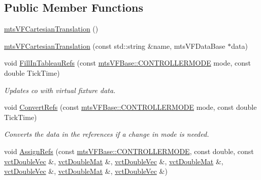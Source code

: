 \subsection*{Public Member Functions}
\begin{DoxyCompactItemize}
\item 
\hyperlink{classmts_v_f_cartesian_translation_a7d231a8919224a527952de0642ada8a3}{mts\-V\-F\-Cartesian\-Translation} ()
\item 
\hyperlink{classmts_v_f_cartesian_translation_a665414c1fa25cee96c3b4ce1d2896af2}{mts\-V\-F\-Cartesian\-Translation} (const std\-::string \&name, mts\-V\-F\-Data\-Base $\ast$data)
\item 
void \hyperlink{classmts_v_f_cartesian_translation_ad86d342b2fb779bb9cd6755c175bfeea}{Fill\-In\-Tableau\-Refs} (const \hyperlink{classmts_v_f_base_a742dd08f8b70bafeb746cec14d9ee974}{mts\-V\-F\-Base\-::\-C\-O\-N\-T\-R\-O\-L\-L\-E\-R\-M\-O\-D\-E} mode, const double Tick\-Time)
\begin{DoxyCompactList}\small\item\em Updates co with virtual fixture data. \end{DoxyCompactList}\item 
void \hyperlink{classmts_v_f_cartesian_translation_aaf1a2989af3387cc5355b3adaaae5fc2}{Convert\-Refs} (const \hyperlink{classmts_v_f_base_a742dd08f8b70bafeb746cec14d9ee974}{mts\-V\-F\-Base\-::\-C\-O\-N\-T\-R\-O\-L\-L\-E\-R\-M\-O\-D\-E} mode, const double Tick\-Time)
\begin{DoxyCompactList}\small\item\em Converts the data in the references if a change in mode is needed. \end{DoxyCompactList}\item 
void \hyperlink{classmts_v_f_cartesian_translation_abc87c7d13e2c60839e9a02e0e6b2742b}{Assign\-Refs} (const \hyperlink{classmts_v_f_base_a742dd08f8b70bafeb746cec14d9ee974}{mts\-V\-F\-Base\-::\-C\-O\-N\-T\-R\-O\-L\-L\-E\-R\-M\-O\-D\-E}, const double, const \hyperlink{vct_dynamic_vector_types_8h_ade4b3068c86fb88f41af2e5187e491c2}{vct\-Double\-Vec} \&, \hyperlink{vct_dynamic_matrix_types_8h_a48f1eb2461d20a99e824ee5753a37c84}{vct\-Double\-Mat} \&, \hyperlink{vct_dynamic_vector_types_8h_ade4b3068c86fb88f41af2e5187e491c2}{vct\-Double\-Vec} \&, \hyperlink{vct_dynamic_matrix_types_8h_a48f1eb2461d20a99e824ee5753a37c84}{vct\-Double\-Mat} \&, \hyperlink{vct_dynamic_vector_types_8h_ade4b3068c86fb88f41af2e5187e491c2}{vct\-Double\-Vec} \&, \hyperlink{vct_dynamic_matrix_types_8h_a48f1eb2461d20a99e824ee5753a37c84}{vct\-Double\-Mat} \&, \hyperlink{vct_dynamic_vector_types_8h_ade4b3068c86fb88f41af2e5187e491c2}{vct\-Double\-Vec} \&)
\end{DoxyCompactItemize}
